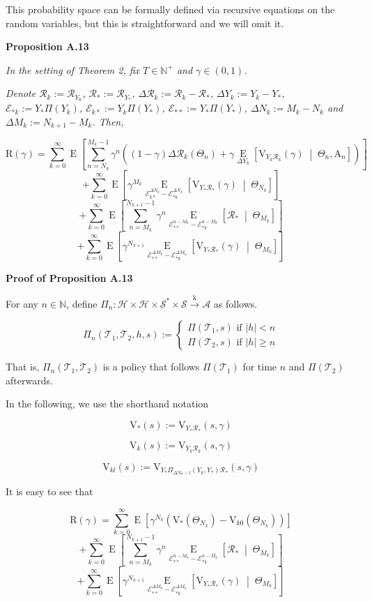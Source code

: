 \documentclass[a4paper]{article}
\newcommand{\Co}[1]{}
\newcommand{\AP}[1]{\left(#1\right)}
\newcommand{\AB}[1]{\left[#1\right]}
\newcommand{\ABM}[2]{\left[#1\;\middle\vert\;#2\right]}
\newcommand{\Abs}[1]{\left\vert #1 \right\vert}
\newcommand{\Ea}[2]{\underset{#1}{\operatorname{E}}\AB{#2}}
\newcommand{\CE}[3]{\underset{#1}{\operatorname{E}}\ABM{#2}{#3}}
\newcommand{\Nats}{\mathbb{N}}
\newcommand{\K}{\xrightarrow{\mathrm{k}}}
\newcommand{\St}{\mathcal{S}}
\newcommand{\A}{\mathcal{A}}
\newcommand{\R}{\mathcal{R}}
\newcommand{\T}{\mathcal{T}}
\newcommand{\Hy}{\mathcal{H}}
\newcommand{\V}{\mathrm{V}}
\newcommand{\Reg}{\mathrm{R}}
\newcommand{\THy}{Y_*}
\newcommand{\SHy}{Y}
\newcommand{\AT}{\mathrm{A}}
\newcommand{\Ev}{\mathcal{E}}
\newcommand{\ET}{N}
\newcommand{\IT}{M}
\begin{document}
This probability space can be formally defined via recursive equations on the random variables, but this is straightforward and we will omit it.

\textbf{Proposition A.13}\Co{b}

\textit{In the setting of Theorem 2, fix $T\in\Nats^+$ and $\gamma\in(0,1)$.}\Co{i}

\textit{Denote $\R_k:=\R_{\SHy_k}$, $\R_*:=\R_{\THy}$, $\Delta\R_k:=\R_k-\R_*$, $\Delta\SHy_k:=\SHy_k-\THy$, $\Ev_{*k}:=\SHy_*\Pi\AP{\SHy_{k}}$, $\Ev_{k*}:=\SHy_{k}\Pi\AP{\SHy_*}$, $\Ev_{**}:=\THy\Pi\AP{\THy}$, $\Delta\ET_k:=\IT_k-\ET_k$ and $\Delta\IT_k:=\ET_{k+1}-\IT_k$. Then,}\Co{i}

$$\Reg(\gamma)=\sum_{k=0}^\infty\Ea{}{\sum_{n=\ET_k}^{\IT_k-1}\gamma^{n}\AP{(1-\gamma)\Delta\R_k\AP{\Theta_n}+\gamma\CE{\Delta\SHy_k}{\V_{\SHy_k\R_k}(\gamma)}{\Theta_n,\AT_n}}}$$
$$+\sum_{k=0}^\infty\Ea{}{{\gamma^{\IT_k}}\CE{\Ev_{k*}^{\Delta\ET_k}-\Ev_{*k}^{\Delta\ET_k}}{\V_{\SHy_*\R_*}(\gamma)}{\Theta_{\ET_k}}}$$
$$+\sum_{k=0}^\infty\Ea{}{\sum_{n=\IT_k}^{\ET_{k+1}-1}\gamma^n\CE{\Ev_{**}^{n-\IT_k}-\Ev_{*k}^{n-\IT_k}}{\R_*}{\Theta_{\IT_k}}}$$
$$+\sum_{k=0}^\infty\Ea{}{\gamma^{\ET_{k+1}}\CE{\Ev_{**}^{\Delta\IT_k}-\Ev_{*k}^{\Delta\IT_k}}{\V_{\THy\R_*}(\gamma)}{\Theta_{\IT_k}}}$$

\textbf{Proof of Proposition A.13}\Co{b}

For any $n\in\Nats$, define $\Pi_n:\Hy\times\Hy\times\St^*\times\St\K\A$ as follows.

$$\Pi_n\AP{\T_1,\T_2,h,s}:=\begin{cases} \Pi\AP{\T_1,s} \text{ if } \Abs{h}<n \\ \Pi\AP{\T_2,s} \text{ if }\Abs{h} \geq n \end{cases}$$

That is, $\Pi_n\AP{\T_1,\T_2}$ is a policy that follows $\Pi\AP{\T_1}$ for time $n$ and $\Pi\AP{\T_2}$ afterwards. 

In the following, we use the shorthand notation 

$$\V_*(s):=\V_{\SHy_*\R_*}(s,\gamma)$$

$$\V_k(s):=\V_{\SHy_{k}\R_k}(s,\gamma)$$

$$\V_{kl}(s):=\V_{\SHy_{*}\Pi_{\Delta\ET_k-l}\AP{\SHy_{k},\SHy_*}\R_*}\AP{s,\gamma}$$

It is easy to see that

$$\Reg(\gamma)=\sum_{k=0}^\infty{\Ea{}{\gamma^{\ET_k}\AP{\V_{*}\AP{\Theta_{\ET_k}}-\V_{k0}\AP{\Theta_{\ET_k}}}}}$$
$$+\sum_{k=0}^\infty\Ea{}{\sum_{n=\IT_k}^{\ET_{k+1}-1}\gamma^n\CE{\Ev_{**}^{n-\IT_k}-\Ev_{*k}^{n-\IT_k}}{\R_*}{\Theta_{\IT_k}}}$$
$$+\sum_{k=0}^\infty\Ea{}{\gamma^{\ET_{k+1}}\CE{\Ev_{**}^{\Delta\IT_k}-\Ev_{*k}^{\Delta\IT_k}}{\V_{\THy\R_*}(\gamma)}{\Theta_{\IT_k}}}$$
\end{document}
